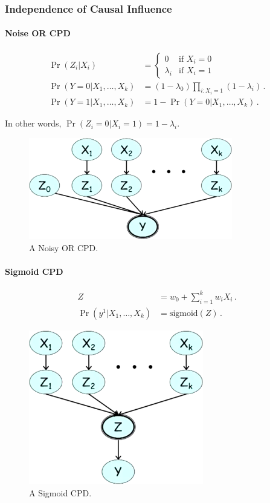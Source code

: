 \documentclass[12pt]{article}
\begin{document}
\subsubsection{Independence of Causal Influence}

\paragraph{Noise OR CPD}
\begin{align*}
  \Pr(Z_i | X_i) & = 
    \begin{cases}
      0 & \text{if } X_i = 0 \\
      \lambda_i & \text{if } X_i = 1
    \end{cases} \\
  \Pr(Y=0 | X_1, \ldots, X_k) & = (1 - \lambda_0) \prod_{i: X_i = 1} (1 - \lambda_i) \, . \\
  \Pr(Y=1 | X_1, \ldots, X_k) & = 1 - \Pr(Y=0 | X_1, \ldots, X_k) \, .
\end{align*}

In other words, $\Pr(Z_i=0 | X_i=1) = 1 - \lambda_i$.

\begin{figure}[H]
\centering
\includegraphics[width=3.5in]{graphics/noisy_or_cpd.png}
\caption{A Noisy OR CPD.}
\label{fig:noisy_or_cpd}
\end{figure}


\paragraph{Sigmoid CPD}

\begin{align*}
  Z & = w_0 + \sum_{i=1}^k w_i X_i \, .\\
  \Pr(y^1 | X_1, \ldots, X_k) & = \text{sigmoid}(Z) \, .
\end{align*}

\begin{figure}[H]
\centering
\includegraphics[width=3in]{graphics/sigmoid_cpd.png}
\caption{A Sigmoid CPD.}
\label{fig:sigmoid_cpd}
\end{figure}
\end{document}
